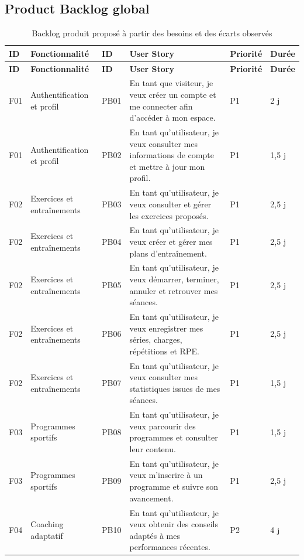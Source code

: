 ﻿\documentclass[12pt,a4paper]{report}
\begin{document}
\subsection{Product Backlog global}
\label{c2-s4-sub1}
\footnotesize
\begin{singlespace}
\begin{longtable}{|p{1cm}|p{4cm}|p{0.9cm}|p{7cm}|p{1.4cm}|p{1.35cm}|}
\caption{Backlog produit proposé à partir des besoins et des écarts observés}\label{tab:product-backlog}\\
\hline
\textbf{ID} & \textbf{Fonctionnalité} & \textbf{ID} & \textbf{User Story} & \textbf{Priorité} & \textbf{Durée} \\\hline
\endfirsthead
\hline
\textbf{ID} & \textbf{Fonctionnalité} & \textbf{ID} & \textbf{User Story} & \textbf{Priorité} & \textbf{Durée} \\\hline
\endhead
F01 & Authentification et profil & PB01 & En tant que visiteur, je veux créer un compte et me connecter afin d'accéder à mon espace. & P1 & 2 j \\\hline
F01 & Authentification et profil & PB02 & En tant qu'utilisateur, je veux consulter mes informations de compte et mettre à jour mon profil. & P1 & 1,5 j \\\hline
F02 & Exercices et entraînements & PB03 & En tant qu'utilisateur, je veux consulter et gérer les exercices proposés. & P1 & 2,5 j \\\hline
F02 & Exercices et entraînements & PB04 & En tant qu'utilisateur, je veux créer et gérer mes plans d'entraînement. & P1 & 2,5 j \\\hline
F02 & Exercices et entraînements & PB05 & En tant qu'utilisateur, je veux démarrer, terminer, annuler et retrouver mes séances. & P1 & 2,5 j \\\hline
F02 & Exercices et entraînements & PB06 & En tant qu'utilisateur, je veux enregistrer mes séries, charges, répétitions et RPE. & P1 & 2,5 j \\\hline
F02 & Exercices et entraînements & PB07 & En tant qu'utilisateur, je veux consulter mes statistiques issues de mes séances. & P1 & 1,5 j \\\hline
F03 & Programmes sportifs & PB08 & En tant qu'utilisateur, je veux parcourir des programmes et consulter leur contenu. & P1 & 1,5 j \\\hline
F03 & Programmes sportifs & PB09 & En tant qu'utilisateur, je veux m'inscrire à un programme et suivre son avancement. & P1 & 2,5 j \\\hline
F04 & Coaching adaptatif & PB10 & En tant qu'utilisateur, je veux obtenir des conseils adaptés à mes performances récentes. & P2 & 4 j \\\hline

\end{longtable}
\end{singlespace}
\end{document}
